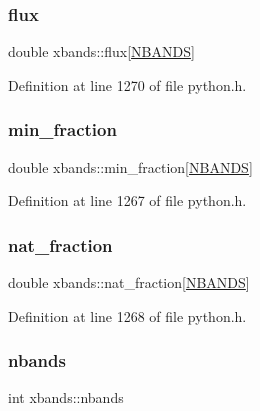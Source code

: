 \mbox{\label{structxbands_aaaed5eb418e48908a4e2c8f4dc0a42c3}} 
\subsubsection{\texorpdfstring{flux}{flux}}
{\footnotesize\ttfamily double xbands\+::flux\mbox{[}\hyperlink{python_8h_a46ee023ac3f5d103e533843238d2e52a}{N\+B\+A\+N\+DS}\mbox{]}}



Definition at line 1270 of file python.\+h.

\mbox{\label{structxbands_a5a7f85ceee248b2268f8a37b6330fa57}} 
\subsubsection{\texorpdfstring{min\+\_\+fraction}{min\_fraction}}
{\footnotesize\ttfamily double xbands\+::min\+\_\+fraction\mbox{[}\hyperlink{python_8h_a46ee023ac3f5d103e533843238d2e52a}{N\+B\+A\+N\+DS}\mbox{]}}



Definition at line 1267 of file python.\+h.

\mbox{\label{structxbands_a7fa4d027ede2f3658d73225c6292089c}} 
\subsubsection{\texorpdfstring{nat\+\_\+fraction}{nat\_fraction}}
{\footnotesize\ttfamily double xbands\+::nat\+\_\+fraction\mbox{[}\hyperlink{python_8h_a46ee023ac3f5d103e533843238d2e52a}{N\+B\+A\+N\+DS}\mbox{]}}



Definition at line 1268 of file python.\+h.

\mbox{\label{structxbands_aad6fe819267976ae85b61e65e0b70f75}} 
\subsubsection{\texorpdfstring{nbands}{nbands}}
{\footnotesize\ttfamily int xbands\+::nbands}



